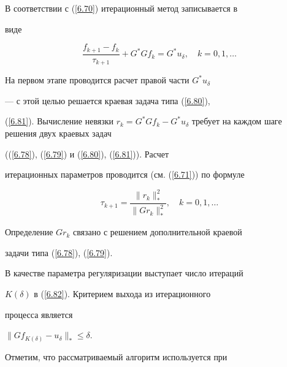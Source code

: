 В соответствии с (\ref{6.70}) итерационный метод записывается в


виде


\begin{equation}\label{6.82}


\frac{f_{k+1} - f_k}{\tau_{k+1}} + G^* G f_k


= G^* u_{\delta} ,


\quad  k = 0,1, \dotsc


\end{equation}


На первом этапе проводится расчет правой части $G^* u_{\delta}$


--- с этой целью решается краевая задача типа (\ref{6.80}),


(\ref{6.81}). Вычисление невязки $r_k = G^* G f_k - G^*


u_{\delta}$ требует на каждом шаге решения двух краевых задач


((\ref{6.78}), (\ref{6.79}) и (\ref{6.80}), (\ref{6.81})). Расчет


итерационных параметров проводится (см. (\ref{6.71})) по формуле


$$




\tau_{k+1} =  \frac{\|r_k\|_*^2}{\|G r_k\|_*^2} ,


\quad k =0,1, \dotsc




$$


Определение $G r_k$ связано с решением дополнительной краевой


задачи типа (\ref{6.78}), (\ref{6.79}).





В качестве параметра регуляризации выступает число итераций


$K(\delta)$ в (\ref{6.82}). Критерием выхода из итерационного


процесса является




$\|G f_{K(\delta)} - u_{\delta}\|_* \le \delta$.







Отметим, что рассматриваемый алгоритм используется при


